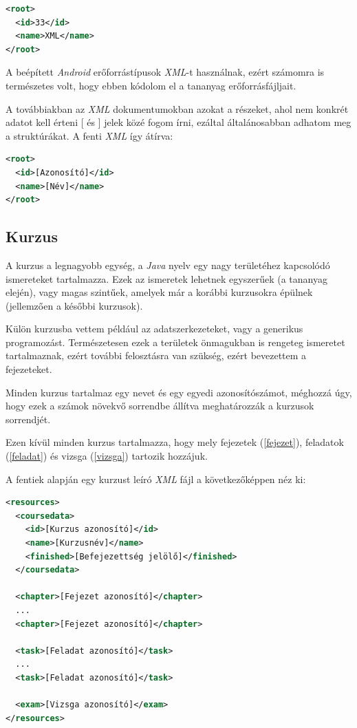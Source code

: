\documentclass[12pt,a4paper]{article}
\newcommand{\xml}{\textit{XML}\xspace}
\begin{document}
	\begin{lstlisting}[language=XML]
<root>
  <id>33</id>
  <name>XML</name>
</root>
	\end{lstlisting}
	
	A beépített \textit{Android} erőforrástípusok \xml-t használnak, ezért számomra is természetes volt, hogy ebben kódolom el a tananyag erőforrásfájljait.
	
	A továbbiakban az \xml dokumentumokban azokat a részeket, ahol nem konkrét adatot kell érteni [ és ] jelek közé fogom írni, ezáltal általánosabban adhatom meg a struktúrákat. A fenti \xml így átírva:
	
	\begin{lstlisting}[language=XML]
<root>
  <id>[Azonosító]</id>
  <name>[Név]</name>
</root>
	\end{lstlisting}
	
	\subsection{Kurzus}
	
	A kurzus a legnagyobb egység, a \textit{Java} nyelv egy nagy területéhez kapcsolódó ismereteket tartalmazza. Ezek az ismeretek lehetnek egyszerűek (a tananyag elején), vagy magas szintűek, amelyek már a korábbi kurzusokra épülnek (jellemzően a későbbi kurzusok).
	
	Külön kurzusba vettem például az adatszerkezeteket, vagy a generikus programozást. Természetesen ezek a területek önmagukban is rengeteg ismeretet tartalmaznak, ezért további felosztásra van szükség, ezért bevezettem a fejezeteket.
	
	Minden kurzus tartalmaz egy nevet és egy egyedi azonosítószámot, méghozzá úgy, hogy ezek a számok növekvő sorrendbe állítva meghatározzák a kurzusok sorrendjét.
	
	Ezen kívül minden kurzus tartalmazza, hogy mely fejezetek (\ref{fejezet}), feladatok (\ref{feladat}) és vizsga (\ref{vizsga}) tartozik hozzájuk.
	
	A fentiek alapján egy kurzust leíró \xml fájl a következőképpen néz ki:
	
	\begin{lstlisting}[language=XML]
<resources>
  <coursedata>
    <id>[Kurzus azonosító]</id>
    <name>[Kurzusnév]</name>
    <finished>[Befejezettség jelölő]</finished>
  </coursedata>
  
  <chapter>[Fejezet azonosító]</chapter>
  ...
  <chapter>[Fejezet azonosító]</chapter>
  
  <task>[Feladat azonosító]</task>
  ...
  <task>[Feladat azonosító]</task>
  
  <exam>[Vizsga azonosító]</exam>
</resources>
	\end{lstlisting}
	
\end{document}
